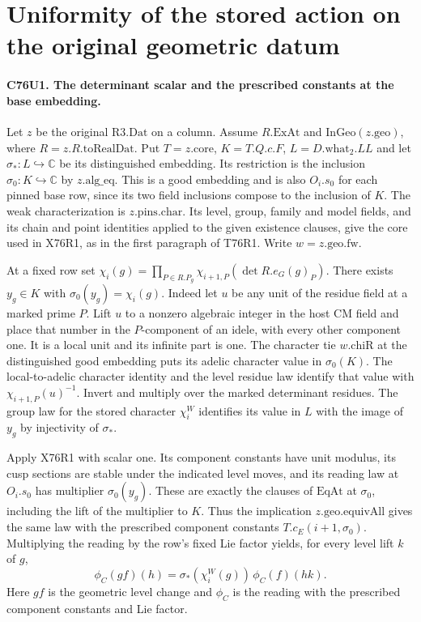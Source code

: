 \section{Uniformity of the stored action on the original geometric datum}

\paragraph{C76U1. The determinant scalar and the prescribed constants at the base embedding.}
Let $z$ be the original $\mathrm{R3.Dat}$ on a column. Assume
$R.\mathrm{ExAt}$ and $\mathrm{InGeo}(z.\mathrm{geo})$, where
$R=z.R.\mathrm{toRealDat}$. Put $T=z.\mathrm{core}$,
$K=T.Q.c.F$, $L=D.\mathrm{what}_2.LL$ and let $\sigma_*:L\hookrightarrow\mathbb C$
be its distinguished embedding. Its restriction is the inclusion
$\sigma_0:K\hookrightarrow\mathbb C$ by $z.\mathrm{alg\_eq}$.
This is a good embedding and is also $O_i.s_0$ for each pinned base
row, since its two field inclusions compose to the inclusion of $K$.
The weak characterization is $z.\mathrm{pins.char}$. Its level,
group, family and model fields, and its chain and point identities
applied to the given existence clauses, give the core used in X76R1,
as in the first paragraph of T76R1. Write $w=z.\mathrm{geo.fw}$.

At a fixed row set $\chi_i(g)=\prod_{P\in R.P_g}
\chi_{i+1,P}(\det R.e_G(g)_P)$. There exists $y_g\in K$ with
$\sigma_0(y_g)=\chi_i(g)$. Indeed let $u$ be any unit of the residue
field at a marked prime $P$. Lift $u$ to a nonzero algebraic integer
in the host CM field and place that number in the $P$-component of
an idele, with every other component one. It is a local unit and its
infinite part is one. The character tie $w.\mathrm{chiR}$ at the
distinguished good embedding puts its adelic character value in
$\sigma_0(K)$. The local-to-adelic character identity and the level
residue law identify that value with $\chi_{i+1,P}(u)^{-1}$.
Invert and multiply over the marked determinant residues. The group
law for the stored character $\chi^{W}_i$ identifies its value in
$L$ with the image of $y_g$ by injectivity of $\sigma_*$.

Apply X76R1 with scalar one. Its component constants have unit modulus,
its cusp sections are stable under the indicated level moves, and its
reading law at $O_i.s_0$ has multiplier $\sigma_0(y_g)$. These are
exactly the clauses of $\mathrm{EqAt}$ at $\sigma_0$, including the
lift of the multiplier to $K$. Thus the implication
$z.\mathrm{geo.equivAll}$ gives the same law with the prescribed
component constants $T.c_E(i+1,\sigma_0)$. Multiplying the reading
by the row's fixed Lie factor yields, for every level lift $k$ of $g$,
\[
 \phi_C(g f)(h)=\sigma_*(\chi_i^{W}(g))\,\phi_C(f)(hk).
\]
Here $g f$ is the geometric level change and $\phi_C$ is the reading
with the prescribed component constants and Lie factor.

